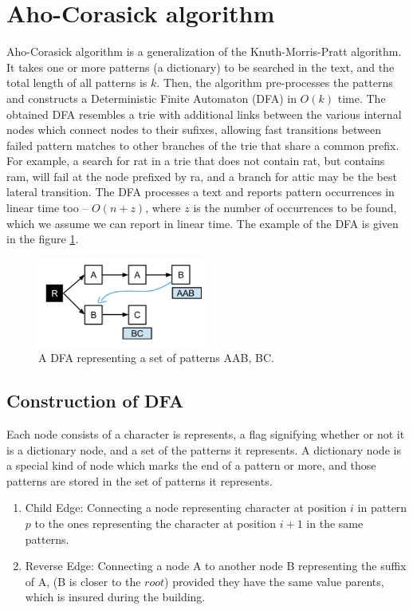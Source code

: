 \documentclass[paper=a4, fontsize=11pt]{scrartcl} %
\numberwithin{equation}{section} %
\numberwithin{figure}{section} %
\numberwithin{table}{section} %
\begin{document}
\newpage
\section{Aho-Corasick algorithm}
Aho-Corasick algorithm \cite{aho} is a generalization of the Knuth-Morris-Pratt algorithm. It takes one or more patterns (a dictionary) to be searched in the text, and the total length of all patterns is $k$. Then, the algorithm pre-processes the patterns and constructs a Deterministic Finite Automaton (DFA) \cite{hopcroft} in $O(k)$ time. The obtained DFA resembles a trie with additional links between the various internal nodes which connect nodes to their sufixes, allowing fast transitions between failed pattern matches to other branches of the trie that share a common prefix. For example, a search for rat in a trie that does not contain rat, but contains ram, will fail at the node prefixed by ra, and a branch for attic may be the best lateral transition. The DFA processes a text and reports pattern occurrences in linear time too -- $O(n + z)$, where $z$ is the number of occurrences to be found, which we assume we can report in linear time. The example of the DFA is given in the figure \ref{dfa}.

\begin{figure}[h!]
\centering
\includegraphics[width=0.5\textwidth]{figures/Example_DFA.png}
\caption{A DFA representing a set of patterns {AAB, BC}.}
\label{dfa}
\end{figure}

\subsection{Construction of DFA}
\label{sec:dfa_const}
Each node consists of a character is represents, a flag signifying whether or not it is a dictionary node, and a set of the patterns it represents. A dictionary node is a special kind of node which marks the end of a pattern or more, and those patterns are stored in the set of patterns it represents.

\begin{enumerate}
\item Child Edge: Connecting a node representing character at position $i$ in pattern $p$ to the ones representing the character at position $i+1$ in the same patterns.
\item Reverse Edge: Connecting a node A to another node B representing the suffix of A, (B is closer to the $root$) provided they have the same value parents, which is insured during the building.
\end{enumerate}
\end{document}
